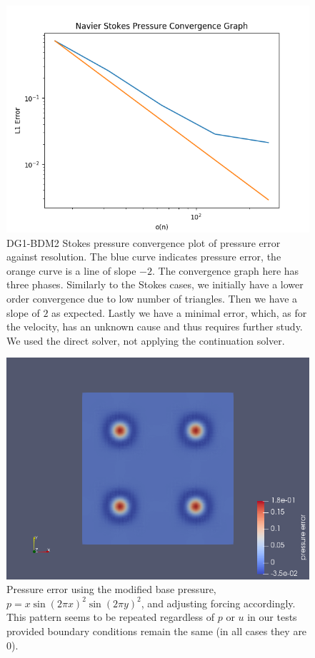 \documentclass[11pt,twoside,a4paper]{article}
\begin{document}
\begin{figure}
\includegraphics[width=\linewidth]{navier_stokes_pressure_convergence_dbc0.png}
  \caption{DG1-BDM2 Stokes pressure convergence plot of pressure error against resolution. The blue curve indicates pressure error, the orange curve is a line of slope $-2$. The convergence graph here has three phases. Similarly to the Stokes cases, we initially have a lower order convergence due to low number of triangles. Then we have a slope of $2$ as expected. Lastly we have a minimal error, which, as for the velocity, has an unknown cause and thus requires further study. We used the direct solver, not applying the continuation solver.}
\end{figure}

\begin{figure}
  \includegraphics[width=\linewidth]{ns_fail_exp.png}
  \caption{Pressure error using the modified base pressure, $p = x \sin(2 \pi x)^2 \sin(2 \pi y)^2$, and adjusting forcing accordingly. This pattern seems to be repeated regardless of $p$ or $u$ in our tests provided boundary conditions remain the same (in all cases they are $0$).}
\end{figure}
\end{document}
